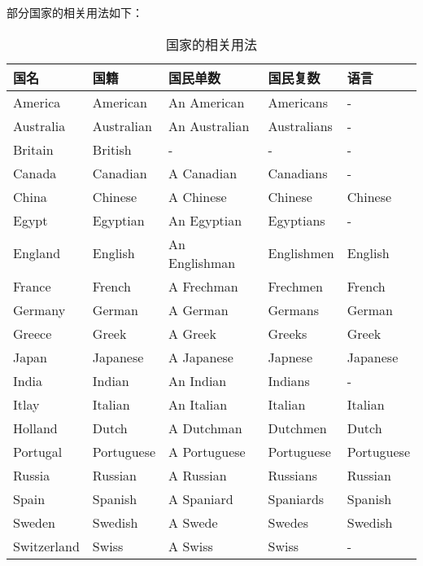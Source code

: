 \documentclass[UTF8]{ctexart}
\begin{document}
    部分国家的相关用法如下：
    \begin{table}[h]
        \begin{center}
            \ttfamily
            \begin{tabular}{p{65pt}|p{60pt}|p{85pt}|p{65pt}|p{60pt}}
                \hline
                国名&国籍&国民单数&国民复数&语言\\ \hline
                America&American&An American&Americans&-\\ \hline
                Australia&Australian&An Australian&Australians&-\\ \hline
                Britain&British&-&-&-\\ \hline
                Canada&Canadian&A Canadian&Canadians&-\\ \hline
                China&Chinese&A Chinese&Chinese&Chinese\\ \hline
                Egypt&Egyptian&An Egyptian&Egyptians&-\\ \hline
                England&English&An Englishman&Englishmen&English\\ \hline
                France&French&A Frechman&Frechmen&French\\ \hline
                Germany&German&A German&Germans&German\\ \hline
                Greece&Greek&A Greek&Greeks&Greek\\ \hline
                Japan&Japanese&A Japanese&Japnese&Japanese\\ \hline
                India&Indian&An Indian&Indians&-\\ \hline
                Itlay&Italian&An Italian&Italian&Italian\\ \hline
                Holland&Dutch&A Dutchman&Dutchmen&Dutch\\ \hline
                Portugal&Portuguese&A Portuguese&Portuguese&Portuguese\\ \hline
                Russia&Russian&A Russian&Russians&Russian\\ \hline
                Spain&Spanish&A Spaniard&Spaniards&Spanish\\ \hline
                Sweden&Swedish&A Swede&Swedes&Swedish\\ \hline
                Switzerland&Swiss&A Swiss&Swiss&-\\ \hline
            \end{tabular}
            \rmfamily
            \caption{国家的相关用法}
        \end{center}
    \end{table}\\
\end{document}
